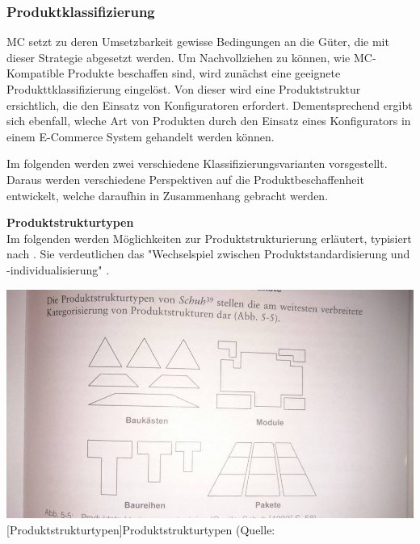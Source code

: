 \documentclass[12pt,a4paper,bibliography=totocnumbered,listof=totoc]{scrartcl}
\begin{document}
\subsubsection{Produktklassifizierung}
 \label{subssubsection:Produktklassifizierung}

\ac{MC} setzt zu deren Umsetzbarkeit gewisse Bedingungen an die Güter, die mit dieser Strategie abgesetzt werden. Um Nachvollziehen zu können, wie \ac{MC}-Kompatible Produkte beschaffen sind, wird zunächst eine geeignete Produkttklassifizierung eingelöst. Von dieser wird eine Produktstruktur ersichtlich, die den Einsatz von Konfiguratoren erfordert. Dementsprechend ergibt sich ebenfall, wleche Art von Produkten durch den Einsatz eines Konfigurators in einem E-Commerce System gehandelt werden können.

Im folgenden werden zwei verschiedene Klassifizierungsvarianten vorsgestellt. Daraus werden verschiedene Perspektiven auf die Produktbeschaffenheit entwickelt, welche daraufhin in Zusammenhang gebracht werden.

\textbf{Produktstrukturtypen}\\
Im folgenden werden Möglichkeiten zur Produktstrukturierung erläutert, typisiert nach \cite{schuh88}. Sie verdeutlichen das "Wechselspiel zwischen Produktstandardisierung und -individualisierung" \citep{lutz11}.

\vspace{1em}
\begin{minipage}{\linewidth}
	\centering
	\includegraphics[width=0.9\linewidth]{Abbildungen/produktstrukturtypen.jpg}
	[Produktstrukturtypen]{Produktstrukturtypen (Quelle: \cite{schuh88}}
	\label{fig:produktstrukturtypen}
\end{minipage}
\vspace{1em}
\end{document}
